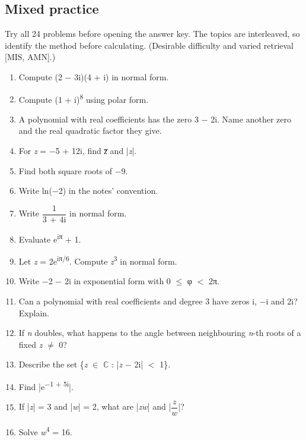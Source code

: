 \documentclass[11pt]{article}
\begin{document}
\begin{keepsection}
\section{Mixed practice}

Try all 24 problems before opening the answer key. The topics are interleaved, so identify the method before calculating. (Desirable difficulty and varied retrieval [MIS, AMN].)

\begin{enumerate}
\item Compute (2 \ensuremath{-} 3i)(4 + i) in normal form.
\item Compute (1 + i)\textsuperscript{8} using polar form.
\item A polynomial with real coefficients has the zero 3 \ensuremath{-} 2i. Name another zero and the real quadratic factor they give.
\item For \textit{z} = \ensuremath{-}5 + 12i, find \textit{z̅} and |\textit{z}|.
\item Find both square roots of \ensuremath{-}9.
\item Write ln(\ensuremath{-}2) in the notes’ convention.
\item Write {\small\ensuremath{\dfrac{1}{3\, +\, 4\mathrm{i}}}} in normal form.
\item Evaluate e\textsuperscript{iπ} + 1.
\item Let \textit{z} = 2e\textsuperscript{iπ/6}. Compute \textit{z}\textsuperscript{3} in normal form.
\item Write \ensuremath{-}2 \ensuremath{-} 2i in exponential form with 0 \ensuremath{\leq} φ \ensuremath{<} 2π.
\item Can a polynomial with real coefficients and degree 3 have zeros i, \ensuremath{-}i and 2i? Explain.
\item If \textit{n} doubles, what happens to the angle between neighbouring \textit{n}-th roots of a fixed \textit{z} \ensuremath{\neq} 0?
\item Describe the set \{\textit{z} \ensuremath{\in} \ensuremath{\mathbb{C}} : |\textit{z} \ensuremath{-} 2i| \ensuremath{<} 1\}.
\item Find |e\textsuperscript{\ensuremath{-}1 + 5i}|.
\item If |\textit{z}| = 3 and |\textit{w}| = 2, what are |\textit{z}\textit{w}| and |{\small\ensuremath{\dfrac{{z}}{{w}}}}|?
\item Solve \textit{w}\textsuperscript{4} = 16.

\end{enumerate}
\end{keepsection}
\end{document}
